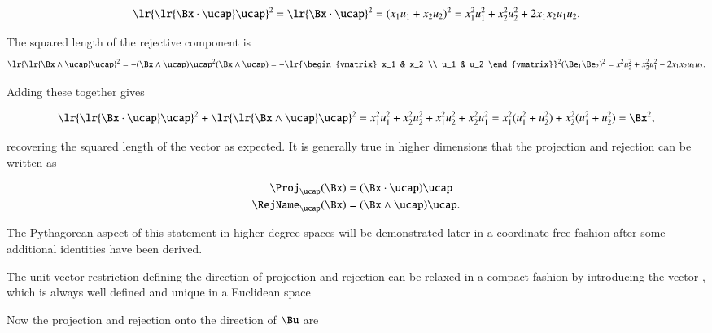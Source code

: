 \begin{dmath}\label{eqn:SimpleProducts2:740}
\lr{ \lr{\Bx \cdot \ucap } \ucap }^2
=
\lr{\Bx \cdot \ucap }^2
=
(x_1 u_1 + x_2 u_2)^2
=
x_1^2 u_1^2 + x_2^2 u_2^2 + 2 x_1 x_2 u_1 u_2.
\end{dmath}

The squared length of the rejective component is
\begin{dmath}\label{eqn:SimpleProducts2:760}
\lr{ \lr{\Bx \wedge \ucap } \ucap }^2
=
-(\Bx \wedge \ucap) \ucap^2 (\Bx \wedge \ucap)
=
-
\lr{\begin{vmatrix}
   x_1 & x_2 \\
   u_1 & u_2
\end{vmatrix}}^2
(\Be_1 \Be_2)^2
=
x_1^2 u_2^2 + x_2^2 u_1^2 - 2 x_1 x_2 u_1 u_2.
\end{dmath}

Adding these together gives

\begin{dmath}\label{eqn:SimpleProducts2:780}
\lr{ \lr{\Bx \cdot \ucap } \ucap }^2 + \lr{ \lr{\Bx \wedge \ucap } \ucap }^2
=
x_1^2 u_1^2 + x_2^2 u_2^2
+x_1^2 u_2^2 + x_2^2 u_1^2
=
x_1^2 ( u_1^2 + u_2^2 )
+
x_2^2 ( u_1^2 + u_2^2 )
=
\Bx^2,
\end{dmath}

recovering the squared length of the vector as expected.
It is generally true in higher dimensions that the projection and rejection can be written as

\begin{dmath}\label{eqn:SimpleProducts2:800}
\begin{aligned}
\Proj_\ucap(\Bx) &= (\Bx \cdot \ucap) \ucap \\
\RejName_\ucap(\Bx) &= (\Bx \wedge \ucap) \ucap.
\end{aligned}
\end{dmath}

The Pythagorean aspect of this statement in higher degree spaces
will be demonstrated later in a coordinate free fashion after some additional identities have been derived.

The unit vector restriction defining the direction of projection and rejection can be relaxed in a compact fashion by introducing the vector , which is always well defined and unique in a Euclidean space


Now the projection and rejection onto the direction of \( \Bu \) are

